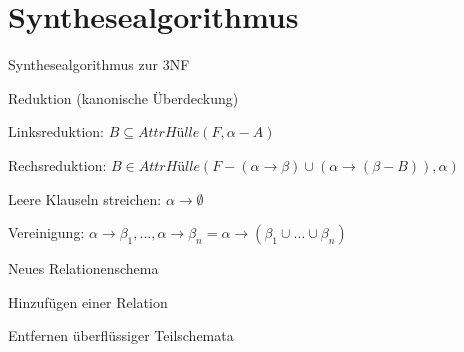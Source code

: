 \documentclass{lehramt-informatik-haupt}
\begin{document}
\chapter{Synthesealgorithmus}

\begin{lernkartei}{Synthesealgorithmus zur 3NF}

\begin{compactenum}
\item Reduktion (kanonische Überdeckung)

\begin{compactenum}
\item Linksreduktion:
$B \subseteq \textit{AttrHülle}(F, \alpha - A)$

\item Rechsreduktion:
$B \in \textit{AttrHülle}(F - (\alpha \rightarrow \beta) \cup (\alpha \rightarrow (\beta - B)), \alpha)$

\item Leere Klauseln streichen:
$\alpha \rightarrow \emptyset$

\item Vereinigung:
$\alpha \rightarrow \beta_1,...,\alpha \rightarrow \beta_n  = \alpha \rightarrow (\beta_1 \cup ... \cup \beta_n)$
\end{compactenum}

\item Neues Relationenschema
\item Hinzufügen einer Relation
\item Entfernen überflüssiger Teilschemata
\end{compactenum}
\end{lernkartei}

\literatur
\end{document}
